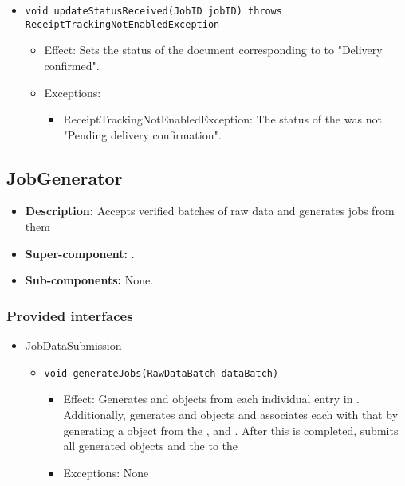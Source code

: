 \begin{itemize}
\begin{itemize}
		\item \texttt{void updateStatusReceived(JobID jobID) throws ReceiptTrackingNotEnabledException}
		\begin{itemize}
            \item Effect: Sets the status of the document corresponding to  to "Delivery confirmed".
            \item Exceptions:
			\begin{itemize}
				\item ReceiptTrackingNotEnabledException: The status of the  was not "Pending delivery confirmation".
			\end{itemize}
        \end{itemize}
    \end{itemize}
\end{itemize}

\subsection{JobGenerator} 
\begin{itemize}
	\item \textbf{Description:} Accepts verified batches of raw data and generates jobs from them
	\item \textbf{Super-component:} .
	\item \textbf{Sub-components:} None.
\end{itemize}

\subsubsection*{Provided interfaces}
\begin{itemize}
	\item JobDataSubmission
	\begin{itemize}
		\item \texttt{void generateJobs(RawDataBatch dataBatch)}
		\begin{itemize}
			\item Effect: Generates  and  objects from each individual entry in . Additionally, generates  and  objects and associates each  with that  by generating a  object from the ,  and . After this is completed, submits all generated  objects and the  to the 
			\item Exceptions: None
		\end{itemize}
	\end{itemize}
\end{itemize}

